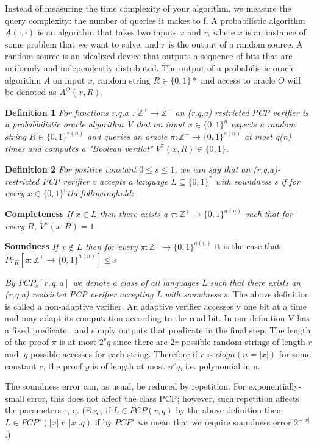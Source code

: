 Instead of measuring the time complexity of your algorithm, we measure the query complexity: the number of queries it makes to f. A probabilistic algorithm $A(·, ·)$ is an algorithm that takes two inputs $x$ and $r$, where $x$ is an instance of some problem that we want to solve, and $r$ is the output of a random source. A random source is an idealized device that outputs a sequence of bits that are uniformly and independently distributed. The output of a probabilistic oracle algorithm $A$ on input $x$, random string $R \in \{0,1\}*$ and access to oracle $O$ will be denoted as $A^O(x,R)$.

\textbf{Definition 1} \textit{For functions r,q,a : $\mathbb{Z}^+ \rightarrow \mathbb{Z}^+$ an (r,q,a) restricted PCP verifier is a probabbilistic oracle algorithm V that on input $x \in \{0,1\}^n$ expects a random string $R \in \{0,1\}^{r(n)}$ and queries an oracle $\pi : \mathbb{Z}^+ \rightarrow \{0,1\}^{a(n)}$ at most q(n) times and computes a "Boolean verdict" $V^{\pi}(x,R) \in \{0,1\}$.}

\textbf{Definition 2} \textit{For positive constant $0 \leq s \leq 1$, we can say that an (r,q,a)-restricted PCP verifier v accepts a language $L \subseteq \{0,1\}^*$ with soundness s if for every $x \in \{0,1\}^n the following hold:$}

\textbf{Completeness} \textit{If $x \in L$ then there exists a $\pi : \mathbb{Z}^+ \rightarrow \{0,1\}^{a(n)}$ such that for every $R$, $V^{\pi}(x:R) = 1$}

\textbf{Soundness} \textit{If $x \notin L$ then for every $\pi : \mathbb{Z}^+ \rightarrow \{0,1\}^{a(n)}$} it is the case that $Pr_R[\pi : \mathbb{Z}^+ \rightarrow \{0,1\}^{a(n)}] \leq s$

\textit{By $PCP_s[r,q,a]$ we denote a class of all languages L such that there exists an (r,q,a) restricted PCP verifier accepting L with soundness s.} The above definition is called a non-adaptive verifier. An adaptive verifier accesses y one bit at a time and may adapt its computation according to the read bit. In our definition V has a fixed predicate , and simply outputs that predicate in the final step. The length of the proof $\pi$ is at most $2^rq$ since there are $2r$ possible random strings of length $r$ and, $q$ possible accesses for each string. Therefore if $r$ is $c log n(n = |x|)$ for some constant $c$, the proof $y$ is of length at most $n^cq$, i.e. polynomial in n.

The soundness error can, as usual, be reduced by repetition. For exponentially-small error, this does not affect the class PCP; however, such repetition affects the parameters r, q. (E.g., if $L \in PCP(r, q)$ by the above definition then $L \in PCP^∗(|x|.r, |x|.q)$ if by $PCP^∗$ we mean that we require soundness error $2^{−|x|}$.)

